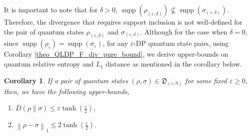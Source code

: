 \documentclass[onecolumn,ldraftcls, 11pt]{IEEEtran}
\newcommand{\supp}{\operatorname{supp}}
\newcommand{\eps}{\varepsilon}
\newcommand{\norm}[2]{{\left\lVert #1 \right\rVert}_{#2}}
\newtheorem{corollary}{Corollary}
\begin{document}
It is important to note that for $\delta > 0$, $\supp(\rho_{(\eps,\delta)}) \not\subseteq \supp(\sigma_{(\eps,\delta)})$. Therefore, the divergence that requires support inclusion is not well-defined for the pair of quantum states $\rho_{(\eps,\delta)}$ and $\sigma_{(\eps,\delta)}$.
Although for the case when $\delta = 0$, since $\supp(\rho_{\eps}) = \supp(\sigma_{\eps})$, for any $\eps$-DP quantum state pairs, using Corollary \ref{theo_QLDP_F_div_pure_bound}, we derive upper-bounds on quantum relative entropy and $L_1$ distance as mentioned in the corollary below.
\begin{corollary}\label{corr_QLDP_Divs_bound}
    If a pair of quantum states $(\rho,\sigma) \in \mathfrak{D}_{(\eps,0)}$ for some fixed $\eps \geq 0$, 
    then, we have the following upper-bounds,

    \begin{enumerate}[label=(\roman*)]
        \item $D(\rho\|\sigma) \leq  \eps \tanh \left(\frac{\eps}{2}\right)$\label{corr_QLDP_KL_bound_eq},
        \vspace*{5pt} 
        \item $\norm{\rho-\sigma}{1} \leq 2 \tanh \left(\frac{\eps}{2}\right)$. \label{corr_QLDP_Hockey_Stick_bound_eq}
    \end{enumerate}
\end{corollary}
\end{document}
